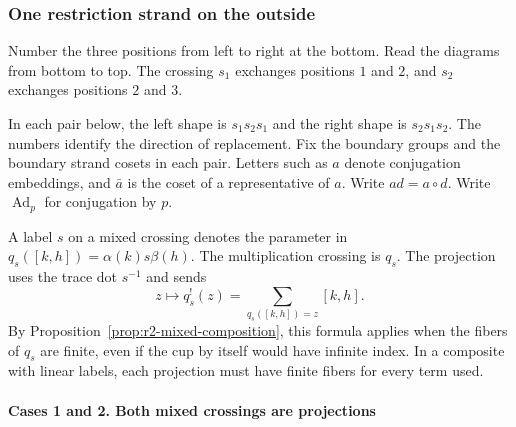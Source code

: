 \documentclass[11pt,a4paper]{article}
\numberwithin{equation}{section}
\theoremstyle{definition}
\begin{document}
\subsubsection{One restriction strand on the outside}\label{sec:outside-restriction}

Number the three positions from left to right at the bottom.
Read the diagrams from bottom to top. The crossing \(s_1\) exchanges
positions \(1\) and \(2\), and \(s_2\) exchanges positions \(2\) and \(3\).

\begin{center}
\end{center}

In each pair below, the left shape is \(s_1s_2s_1\) and the right shape is
\(s_2s_1s_2\). The numbers identify the direction of replacement.
Fix the boundary groups and the boundary strand cosets in each pair.
Letters such as \(a\) denote conjugation embeddings, and \(\bar a\) is
the coset of a representative of \(a\). Write \(ad=a\circ d\).
Write \(\operatorname{Ad}_p\) for conjugation by \(p\).

A label \(s\) on a mixed crossing denotes the parameter in
\(q_s([k,h])=\alpha(k)s\beta(h)\). The multiplication crossing is
\(q_s\). The projection uses the trace dot \(s^{-1}\) and sends
\[
 z\longmapsto q_s^!(z)=\sum_{q_s([k,h])=z}[k,h].
\]
By Proposition~\ref{prop:r2-mixed-composition}, this formula applies
when the fibers of \(q_s\) are finite, even if the cup by itself
would have infinite index. In a composite with linear labels,
each projection must have finite fibers for every term used.

\paragraph{Cases 1 and 2. Both mixed crossings are projections}\mbox{}\par
\end{document}

